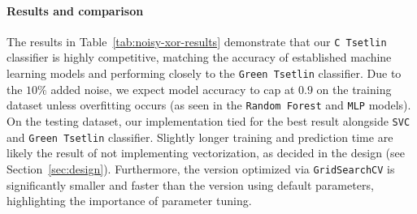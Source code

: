 \paragraph{Results and comparison}
The results in Table~\ref{tab:noisy-xor-results} demonstrate that our \texttt{C Tsetlin} classifier is highly competitive, matching the accuracy of established machine learning models and performing closely to the \texttt{Green Tsetlin} classifier. Due to the $10\%$ added noise, we expect model accuracy to cap at $0.9$ on the training dataset unless overfitting occurs (as seen in the \texttt{Random Forest} and \texttt{MLP} models). On the testing dataset, our implementation tied for the best result alongside \texttt{SVC} and \texttt{Green Tsetlin} classifier. Slightly longer training and prediction time are likely the result of \LibraryName not implementing vectorization, as decided in the design (see Section~\ref{sec:design}). Furthermore, the version optimized via \texttt{GridSearchCV} is significantly smaller and faster than the version using default parameters, highlighting the importance of parameter tuning.

